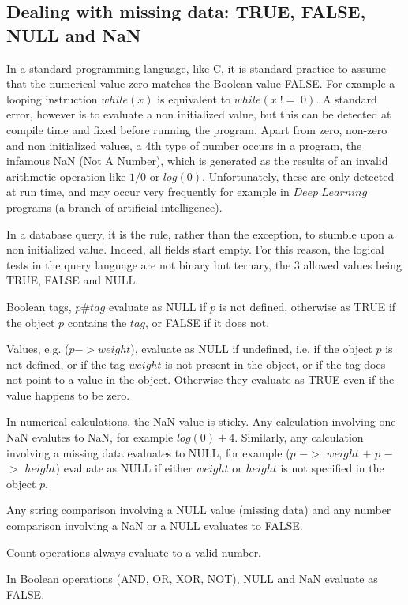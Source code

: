 \documentclass[11pt]{article}
\begin{document}
\subsection{Dealing with missing data: TRUE, FALSE, NULL and NaN}

In a standard programming language, like C, it is standard practice to
assume that the numerical value zero matches the Boolean value FALSE.
For example a looping instruction $while(x)$ is equivalent
to $while(x\;!=\;0)$. A standard error, however is to evaluate
a non initialized value, but this can be detected at compile time and fixed
before running the program. Apart from zero, non-zero and non initialized values,
a 4th type of number occurs in a program, the infamous NaN (Not A Number), which is generated
as the results of an invalid arithmetic operation like $1/0$ or $log(0)$.
Unfortunately, these are only detected at run time, and may occur very frequently for
example in $Deep\;Learning$ programs (a branch of artificial intelligence).

In a database query, it is the rule, rather than the exception, to stumble
upon a non initialized value. Indeed, all fields start empty. For this
reason, the logical tests in the query language are not binary but ternary,
the 3 allowed values being TRUE, FALSE and NULL. 

Boolean tags, $p\#tag$ evaluate as NULL if $p$ is not defined, otherwise as TRUE
if the object $p$ contains the $tag$, or FALSE if it does not.

Values, e.g. ($p$$-$$>$$weight$), evaluate as NULL if undefined, i.e. if the object $p$ is not defined, 
or if the tag $weight$ is not present in the object, or if the tag does not point to a value in the object.
Otherwise they evaluate as TRUE even if the value happens to be zero.

In numerical calculations, the NaN value is sticky. Any calculation involving one NaN
evalutes to NaN, for example $log(0) + 4$. Similarly, any calculation
involving a missing data evaluates to NULL, for example ($p$ $-$$>$ $weight$ $+$ $p$ $-$$>$ $height$)
evaluate as NULL
if either $weight$ or $height$ is not specified in the object $p$.

Any string comparison involving a NULL value (missing data) and any number comparison
involving a NaN or a NULL evaluates to FALSE.

Count operations always evaluate to a valid number.

In Boolean operations (AND, OR, XOR, NOT), NULL and NaN evaluate as FALSE.
\end{document}
